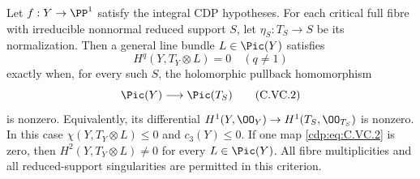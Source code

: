 
\begin{proposition}\label{cdp:st:C4f}
Let $f:Y\to\PP^1$ satisfy the integral CDP hypotheses.
For each critical full fibre with
irreducible nonnormal reduced support $S$, let
$\eta_S:T_S\to S$ be its normalization. Then a general
line bundle $L\in\Pic(Y)$ satisfies
\[
 H^q(Y,T_Y\otimes L)=0\quad(q\ne1)
 \tag{C.VC.1}\label{cdp:eq:C.VC.1}
\]
exactly when, for every such $S$, the holomorphic pullback
homomorphism
\[
 \Pic(Y)\longrightarrow\Pic(T_S)
 \tag{C.VC.2}\label{cdp:eq:C.VC.2}
\]
is nonzero. Equivalently, its differential
$H^1(Y,\OO_Y)\to H^1(T_S,\OO_{T_S})$ is nonzero.
In this case $\chi(Y,T_Y\otimes L)\le0$ and $c_3(Y)\le0$.
If one map \eqref{cdp:eq:C.VC.2} is zero, then
$H^2(Y,T_Y\otimes L)\ne0$ for every $L\in\Pic(Y)$.
All fibre multiplicities and all reduced-support
singularities are permitted in this criterion.
\end{proposition}
